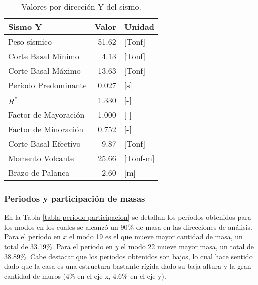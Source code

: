 \begin{table}[H]
  \centering
  \caption{Valores por dirección Y del sismo.}
  \begin{tabular}{lrl}
    \hline
    \textbf{Sismo Y} & \multicolumn{1}{c}{\textbf{Valor}} & \multicolumn{1}{c}{\textbf{Unidad}} \bigstrut\\
    \hline
    Peso sísmico & 51.62 & [Tonf] \bigstrut[t]\\
    Corte Basal Mínimo & 4.13  & [Tonf] \\
    Corte Basal Máximo & 13.63 & [Tonf] \\
    Período Predominante & 0.027 & [s] \\
    $R^*$ & 1.330 & [-] \\
    Factor de Mayoración & 1.000 & [-] \\
    Factor de Minoración & 0.752 & [-] \\
    Corte Basal Efectivo & 9.87  & [Tonf] \\
    Momento Volcante & 25.66 & [Tonf-m] \\
    Brazo de Palanca & 2.60  & [m] \bigstrut[b]\\
    \hline
  \end{tabular}
\end{table}

\subsubsection{Periodos y participación de masas}

En la Tabla \ref{tabla-periodo-participacion} se detallan los períodos obtenidos para los modos en los cuales se alcanzó un 90\% de masa en las direcciones de análisis. Para el período en $x$ el modo 19 es el que mueve mayor cantidad de masa, un total de 33.19\%. Para el período en $y$ el modo 22 mueve mayor masa, un total de 38.89\%. Cabe destacar que los periodos obtenidos son bajos, lo cual hace sentido dado que la casa es una estructura bastante rígida dado su baja altura y la gran cantidad de muros (4\% en el eje x, 4.6\% en el eje y).

